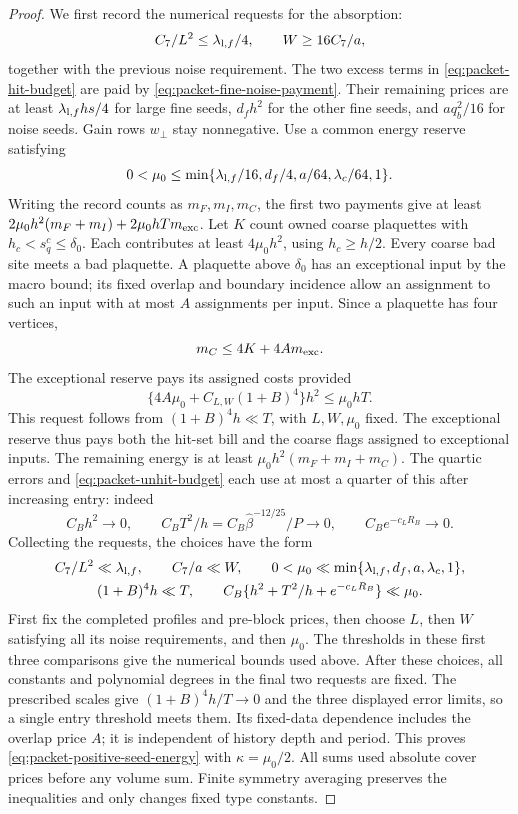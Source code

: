 \documentclass[11pt,reqno]{amsart}
\numberwithin{equation}{section}
\theoremstyle{definition}
\theoremstyle{remark}
\begin{document}
\begin{proof}
We first record the numerical requests for the absorption:
\[
       C_7/L^2\le\lambda_{{\rm l},f}/4,\qquad W\ge16C_7/a,
\]
together with the previous noise requirement. The two excess terms in
\eqref{eq:packet-hit-budget} are paid by
\eqref{eq:packet-fine-noise-payment}. Their remaining prices
are at least \(\lambda_{{\rm l},f}hs/4\) for large fine
seeds, \(d_fh^2\) for the other fine seeds, and \(aq_b^2/16\)
for noise seeds. Gain rows \(w_\perp\) stay nonnegative.
Use a common energy reserve satisfying
\[
 0<\mu_0\le\min\{\lambda_{{\rm l},f}/16,d_f/4,
                                  a/64,\lambda_c/64,1\}.
\]
Writing the record counts as \(m_F,m_I,m_C\), the first two
payments give at least
\(2\mu_0h^2(m_F+m_I)+2\mu_0hT m_{\rm exc}\).
Let \(K\) count owned coarse plaquettes with
\(h_c<s_q^c\le\delta_0\). Each contributes at least
\(4\mu_0h^2\), using \(h_c\ge h/2\).
Every coarse bad site meets a bad plaquette. A plaquette above
\(\delta_0\) has an exceptional input by the macro bound;
its fixed overlap and boundary incidence allow an assignment
to such an input with at most \(A\) assignments per input.
Since a plaquette has four vertices,
\[
                              m_C\le4K+4A m_{\rm exc}.
\]
The exceptional reserve pays its assigned costs provided
\[
    \{4A\mu_0+C_{L,W}(1+B)^4\}h^2\le\mu_0hT.
\]
This request follows from \((1+B)^4h\ll T\), with \(L,W,\mu_0\) fixed.
The exceptional reserve thus pays both the hit-set bill and
the coarse flags assigned to exceptional inputs. The remaining
energy is at least \(\mu_0h^2(m_F+m_I+m_C)\).
The quartic errors and \eqref{eq:packet-unhit-budget} each
use at most a quarter of this after increasing entry: indeed
\[
 C_Bh^2\to0,\qquad
 C_BT^2/h=C_B\widehat\beta^{-12/25}/P\to0,\qquad
                              C_Be^{-c_LR_B}\to0.
\]
Collecting the requests, the choices have the form
\[
 \begin{gathered}
 C_7/L^2\ll\lambda_{{\rm l},f},\qquad C_7/a\ll W,\qquad
 0<\mu_0\ll\min\{\lambda_{{\rm l},f},d_f,a,\lambda_c,1\},\\
 (1+B)^4h\ll T,\qquad
 C_B\{h^2+T^2/h+e^{-c_LR_B}\}\ll\mu_0.
 \end{gathered}
\]
First fix the completed profiles and pre-block prices, then choose
\(L\), then \(W\) satisfying all its noise requirements, and then
\(\mu_0\). The thresholds in these first three comparisons give
the numerical bounds used above. After these choices, all
constants and polynomial degrees in the final two requests are
fixed. The prescribed scales give \((1+B)^4h/T\to0\) and the
three displayed error limits, so a single entry threshold meets
them. Its fixed-data dependence includes the overlap price \(A\);
it is independent of history depth and period.
This proves \eqref{eq:packet-positive-seed-energy} with
\(\kappa=\mu_0/2\). All sums used absolute cover prices
before any volume sum. Finite symmetry averaging preserves
the inequalities and only changes fixed type constants.
\end{proof}
\end{document}
